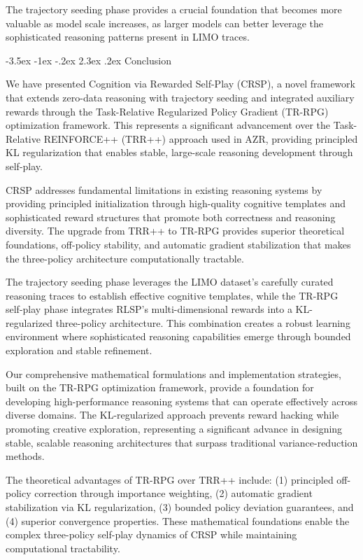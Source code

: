 \documentclass[10pt,a4paper]{article}
\makeatletter
\renewcommand\section{\@startsection{section}{1}{\z@}%
  {-3.5ex \@plus -1ex \@minus -.2ex}%
  {2.3ex \@plus.2ex}%
  {\fontfamily{sourcecodepro}\selectfont\Large\bfseries}}
\makeatother
\begin{document}
The trajectory seeding phase provides a crucial foundation that becomes more valuable as model scale increases, as larger models can better leverage the sophisticated reasoning patterns present in LIMO traces.

\section{Conclusion}

We have presented Cognition via Rewarded Self-Play (CRSP), a novel framework that extends zero-data reasoning with trajectory seeding and integrated auxiliary rewards through the Task-Relative Regularized Policy Gradient (TR-RPG) optimization framework. This represents a significant advancement over the Task-Relative REINFORCE++ (TRR++) approach used in AZR, providing principled KL regularization that enables stable, large-scale reasoning development through self-play.

CRSP addresses fundamental limitations in existing reasoning systems by providing principled initialization through high-quality cognitive templates and sophisticated reward structures that promote both correctness and reasoning diversity. The upgrade from TRR++ to TR-RPG provides superior theoretical foundations, off-policy stability, and automatic gradient stabilization that makes the three-policy architecture computationally tractable.

The trajectory seeding phase leverages the LIMO dataset's carefully curated reasoning traces to establish effective cognitive templates, while the TR-RPG self-play phase integrates RLSP's multi-dimensional rewards into a KL-regularized three-policy architecture. This combination creates a robust learning environment where sophisticated reasoning capabilities emerge through bounded exploration and stable refinement.

Our comprehensive mathematical formulations and implementation strategies, built on the TR-RPG optimization framework, provide a foundation for developing high-performance reasoning systems that can operate effectively across diverse domains. The KL-regularized approach prevents reward hacking while promoting creative exploration, representing a significant advance in designing stable, scalable reasoning architectures that surpass traditional variance-reduction methods.

The theoretical advantages of TR-RPG over TRR++ include: (1) principled off-policy correction through importance weighting, (2) automatic gradient stabilization via KL regularization, (3) bounded policy deviation guarantees, and (4) superior convergence properties. These mathematical foundations enable the complex three-policy self-play dynamics of CRSP while maintaining computational tractability.
\end{document}
